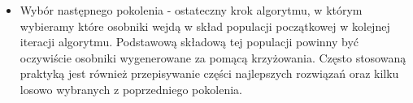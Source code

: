 \begin{itemize}
    \item Wybór następnego pokolenia - ostateczny krok algorytmu, w którym wybieramy które osobniki wejdą w skład populacji początkowej w 
    kolejnej iteracji algorytmu. Podstawową składową tej populacji powinny być oczywiście osobniki wygenerowane za pomącą krzyżowania. Często 
    stosowaną praktyką jest również przepisywanie części najlepszych rozwiązań oraz kilku losowo wybranych z poprzedniego pokolenia. 

\end{itemize}